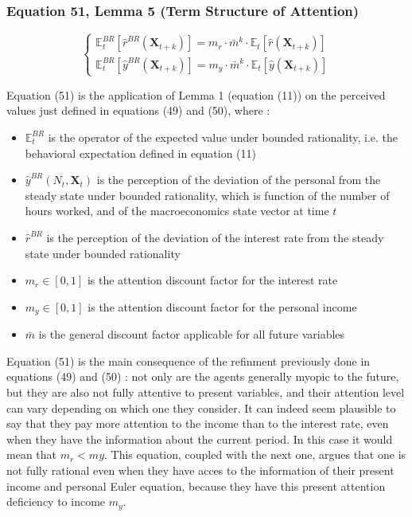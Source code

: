 \documentclass{article}
\begin{document}
\subsubsection*{Equation 51, Lemma 5 (Term Structure of Attention)}

\begin{equation}\tag{51}
    \begin{cases}
        \mathbb{E}_{t}^{BR}\left[\hat{r}^{BR}(\textbf{X}_{t+k})\right]=m_{r}\cdot\bar{m}^{k}\cdot\mathbb{E}_{t}\left[\hat{r}(\textbf{X}_{t+k})\right] \\
        \mathbb{E}_{t}^{BR}\left[\hat{y}^{BR}(\textbf{X}_{t+k})\right]=m_{y}\cdot\bar{m}^{k}\cdot\mathbb{E}_{t}\left[\hat{y}(\textbf{X}_{t+k})\right]
    \end{cases}
\end{equation}

Equation (51) is the application of Lemma 1 (equation (11)) on the perceived values just defined in equations (49) and (50), where : 
\begin{itemize}
    \item $\mathbb{E}_{t}^{BR}$ is the operator of the expected value under bounded rationality, i.e. the behavioral expectation defined in equation (11)
    \item $\hat{y}^{BR}(N_{t},\textbf{X}_{t})$ is the perception of the deviation of the personal from the steady state under bounded rationality, which is function of the number of hours worked, and of the macroeconomics state vector at time $t$
    \item $\hat{r}^{BR}$ is the perception of the deviation of the interest rate from the steady state under bounded rationality
    \item $m_{r}\in\left[0,1\right]$ is the attention discount factor for the interest rate
    \item $m_{y}\in\left[0,1\right]$ is the attention discount factor for the personal income
    \item $\bar{m}$ is the general discount factor applicable for all future variables
\end{itemize}

Equation (51) is the main consequence of the refinment previously done in equations (49) and (50) : not only are the agents generally myopic to the future, but they are also not fully attentive to present variables, and their attention level can vary depending on which one they consider.
It can indeed seem plausible to say that they pay more attention to the income than to the interest rate, even when they have the information about the current period. In this case it would mean that $m_{r}<m{y}$. 
This equation, coupled with the next one, argues that one is not fully rational even when they have acces to the information of their present income and personal Euler equation, because they have this present attention deficiency to income $m_{y}$.
\end{document}

